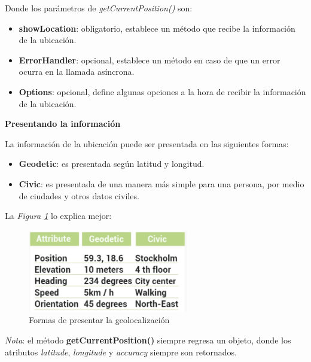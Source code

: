 Donde los parámetros de \textit{getCurrentPosition()} son:
\begin{itemize}
    \item \textbf{showLocation}: obligatorio, establece un método que recibe la información de la ubicación.
    \item \textbf{ErrorHandler}: opcional, establece un método en caso de que un error ocurra en la llamada asíncrona.
    \item \textbf{Options}: opcional, define algunas opciones a la hora de recibir la información de la ubicación.
\end{itemize}

\textbf{Presentando la información}

La información de la ubicación puede ser presentada en las siguientes formas:
\begin{itemize}
    \item \textbf{Geodetic}: es presentada según latitud y longitud.
    \item \textbf{Civic}: es presentada de una manera más simple para una persona, por medio de ciudades y otros datos civiles.
\end{itemize}

La \textit{Figura \ref{fig: 18}} lo explica mejor:
\begin{figure}[H]
    \centering
    \caption{Formas de presentar la geolocalización}
    \label{fig: 18}
    \includegraphics[width=7cm]{ss_html/geolocation.png}
\end{figure}

\textit{Nota}: el método \textbf{getCurrentPosition()} siempre regresa un objeto, donde los atributos \textit{latitude}, \textit{longitude} y \textit{accuracy} siempre son retornados.

